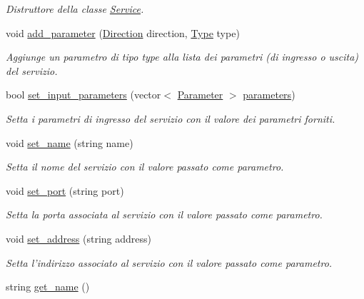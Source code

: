 \begin{DoxyCompactItemize}
\begin{DoxyCompactList}\small\item\em Distruttore della classe \hyperlink{class_service}{Service}. \end{DoxyCompactList}\item 
void \hyperlink{class_service_a3905da32f595397967e7aada8300ec6c}{add\-\_\-parameter} (\hyperlink{_types_8h_a224b9163917ac32fc95a60d8c1eec3aa}{Direction} direction, \hyperlink{_types_8h_a1d1cfd8ffb84e947f82999c682b666a7}{Type} type)
\begin{DoxyCompactList}\small\item\em Aggiunge un parametro di tipo {\itshape type} alla lista dei parametri (di ingresso o uscita) del servizio. \end{DoxyCompactList}\item 
bool \hyperlink{class_service_ab475411bca62ebf3cbbcf338285f4975}{set\-\_\-input\-\_\-parameters} (vector$<$ \hyperlink{struct_parameter}{Parameter} $>$ \hyperlink{class_service_a92a0bf45e91da701d22152651d3c7907}{parameters})
\begin{DoxyCompactList}\small\item\em Setta i parametri di ingresso del servizio con il valore dei parametri forniti. \end{DoxyCompactList}\item 
void \hyperlink{class_service_a091d68c0751de158de2c2f64aeb9cdc8}{set\-\_\-name} (string name)
\begin{DoxyCompactList}\small\item\em Setta il nome del servizio con il valore passato come parametro. \end{DoxyCompactList}\item 
void \hyperlink{class_service_a69f551db5d32632d9558df9de84f023c}{set\-\_\-port} (string port)
\begin{DoxyCompactList}\small\item\em Setta la porta associata al servizio con il valore passato come parametro. \end{DoxyCompactList}\item 
void \hyperlink{class_service_abee2b18fa2bb31c31915c2cda525355b}{set\-\_\-address} (string address)
\begin{DoxyCompactList}\small\item\em Setta l'indirizzo associato al servizio con il valore passato come parametro. \end{DoxyCompactList}\item 
string \hyperlink{class_service_af7450cf76dd2c06d556b55c8555670f5}{get\-\_\-name} ()

\end{DoxyCompactItemize}
